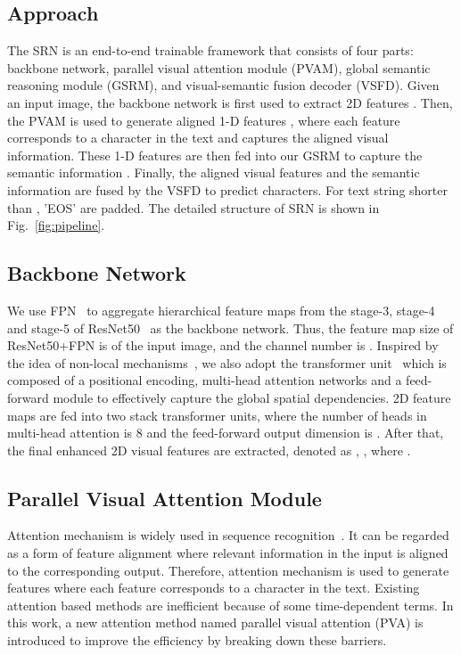 \documentclass[10pt,twocolumn,letterpaper]{article}
\begin{document}
\begin{CJK}{UTF8}{gbsn}
\section{Approach}
The SRN is an end-to-end trainable framework that consists of four parts: backbone network, parallel visual attention module (PVAM), global semantic reasoning module (GSRM), and visual-semantic fusion decoder (VSFD).
Given an input image, the backbone network is first used to extract 2D features . Then, the PVAM is used to generate  aligned 1-D features , where each feature corresponds to a character in the text and captures the aligned visual information. These  1-D features  are then fed into our GSRM to capture the semantic information . Finally, the aligned visual features  and the semantic information  are fused by the VSFD to predict  characters. For text string shorter than , 'EOS' are padded. The detailed structure of SRN is shown in Fig.~\ref{fig:pipeline}.

\subsection{Backbone Network}\label{sec:backbone network}
We use FPN~\cite{lin2017feature} to aggregate hierarchical feature maps from the stage-3, stage-4 and stage-5 of ResNet50~\cite{he2016deep} as the backbone network. Thus, the feature map size of ResNet50+FPN is  of the input image, and the channel number is .
Inspired by the idea of non-local mechanisms~\cite{buades2005non}, we also adopt the transformer unit~\cite{vaswani2017attention} which is composed of a positional encoding, multi-head attention networks and a feed-forward module to effectively capture the global spatial dependencies. 
2D feature maps are fed into two stack transformer units, where the number of heads in multi-head attention is 8 and the feed-forward output dimension is .
After that, the final enhanced 2D visual features are extracted, denoted as , , where .

\subsection{Parallel Visual Attention Module}
Attention mechanism is widely used in sequence recognition~\cite{cheng2017focusing,shi2016robust}. It can be regarded as a form of feature alignment where relevant information in the input is aligned to the corresponding output. 
Therefore, attention mechanism is used to generate  features where each feature corresponds to a character in the text.
Existing attention based methods are inefficient because of some time-dependent terms. In this work, a new attention method named parallel visual attention (PVA) is introduced to improve the efficiency by breaking down these barriers.


\end{CJK}
\end{document}
